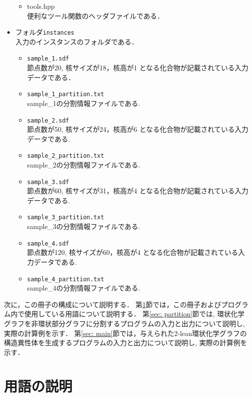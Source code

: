 \documentclass[11pt,titlepage,dvipdfmx,twoside]{jarticle}
\begin{document}
\begin{itemize}
\begin{itemize}
			\item{tools.hpp}\\
				便利なツール関数のヘッダファイルである．		
		\end{itemize}
	\item フォルダ{\tt instances}\\
		入力のインスタンスのフォルダである．
		\begin{itemize}
			\item{\tt sample\_1.sdf}\\
				節点数が20, 核サイズが18，核高が1
				となる化合物が記載されている入力データである．
			\item{\tt sample\_1\_partition.txt}\\
				sample\_1の分割情報ファイルである.
				\item{\tt sample\_2.sdf}\\
				節点数が50, 核サイズが24，核高が6
				となる化合物が記載されている入力データである.
			\item{\tt sample\_2\_partition.txt}\\
			sample\_2の分割情報ファイルである.
			\item{\tt sample\_3.sdf}\\
			節点数が60, 核サイズが31，核高が4
			となる化合物が記載されている入力データである.
			\item{\tt sample\_3\_partition.txt}\\
			sample\_3の分割情報ファイルである.
			\item{\tt sample\_4.sdf}\\
			節点数が120, 核サイズが60，核高が4
			となる化合物が記載されている入力データである.
			\item{\tt sample\_4\_partition.txt}\\
			sample\_4の分割情報ファイルである.

		\end{itemize}

	\end{itemize}

次に，この冊子の構成について説明する．
第\ref{sec:term}節では，この冊子およびプログラム内で使用している用語について説明する．
第\ref{sec: partition}節では, 環状化学グラフを非環状部分グラフに分割するプログラムの入力と出力について説明し, 実際の計算例を示す．
第\ref{sec: main}節では，与えられた2-lean環状化学グラフの構造異性体を生成するプログラムの入力と出力について説明し, 実際の計算例を示す．


\newpage

\section{用語の説明}
\label{sec:term}
\end{document}
